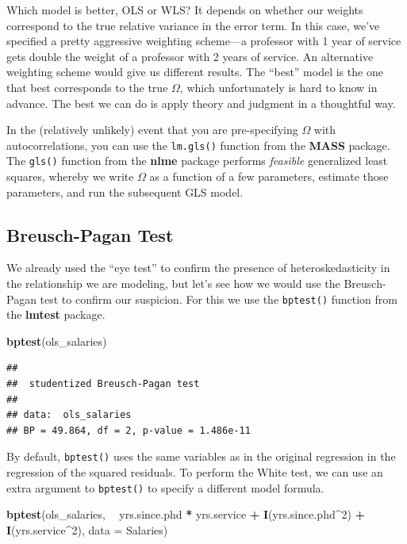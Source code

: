 \documentclass[12pt,oneside,openany]{book}
\newenvironment{Shaded}{\begin{snugshade}}{\end{snugshade}}
\newcommand{\KeywordTok}[1]{\textcolor[rgb]{0.13,0.29,0.53}{\textbf{#1}}}
\newcommand{\DataTypeTok}[1]{\textcolor[rgb]{0.13,0.29,0.53}{#1}}
\newcommand{\DecValTok}[1]{\textcolor[rgb]{0.00,0.00,0.81}{#1}}
\newcommand{\StringTok}[1]{\textcolor[rgb]{0.31,0.60,0.02}{#1}}
\newcommand{\OperatorTok}[1]{\textcolor[rgb]{0.81,0.36,0.00}{\textbf{#1}}}
\newcommand{\NormalTok}[1]{#1}
\begin{document}
Which model is better, OLS or WLS? It depends on whether our weights
correspond to the true relative variance in the error term. In this
case, we've specified a pretty aggressive weighting scheme---a professor
with 1 year of service gets double the weight of a professor with 2
years of service. An alternative weighting scheme would give us
different results. The ``best'' model is the one that best corresponds
to the true \(\Omega\), which unfortunately is hard to know in advance.
The best we can do is apply theory and judgment in a thoughtful way.

In the (relatively unlikely) event that you are pre-specifying
\(\Omega\) with autocorrelations, you can use the \texttt{lm.gls()}
function from the \textbf{MASS} package. The \texttt{gls()} function
from the \textbf{nlme} package performs \emph{feasible} generalized
least squares, whereby we write \(\Omega\) as a function of a few
parameters, estimate those parameters, and run the subsequent GLS model.

\subsection{Breusch-Pagan Test}\label{breusch-pagan-test}

We already used the ``eye test'' to confirm the presence of
heteroskedasticity in the relationship we are modeling, but let's see
how we would use the Breusch-Pagan test to confirm our suspicion. For
this we use the \texttt{bptest()} function from the \textbf{lmtest}
package.

\begin{Shaded}
\begin{Highlighting}[]
\KeywordTok{bptest}\NormalTok{(ols_salaries)}
\end{Highlighting}
\end{Shaded}

\begin{verbatim}
## 
##  studentized Breusch-Pagan test
## 
## data:  ols_salaries
## BP = 49.864, df = 2, p-value = 1.486e-11
\end{verbatim}

By default, \texttt{bptest()} uses the same variables as in the original
regression in the regression of the squared residuals. To perform the
White test, we can use an extra argument to \texttt{bptest()} to specify
a different model formula.

\begin{Shaded}
\begin{Highlighting}[]
\KeywordTok{bptest}\NormalTok{(ols_salaries,}
       \OperatorTok{~}\StringTok{ }\NormalTok{yrs.since.phd }\OperatorTok{*}\StringTok{ }\NormalTok{yrs.service }\OperatorTok{+}\StringTok{ }\KeywordTok{I}\NormalTok{(yrs.since.phd}\OperatorTok{^}\DecValTok{2}\NormalTok{) }\OperatorTok{+}\StringTok{ }\KeywordTok{I}\NormalTok{(yrs.service}\OperatorTok{^}\DecValTok{2}\NormalTok{),}
       \DataTypeTok{data =}\NormalTok{ Salaries)}
\end{Highlighting}
\end{Shaded}
\end{document}
